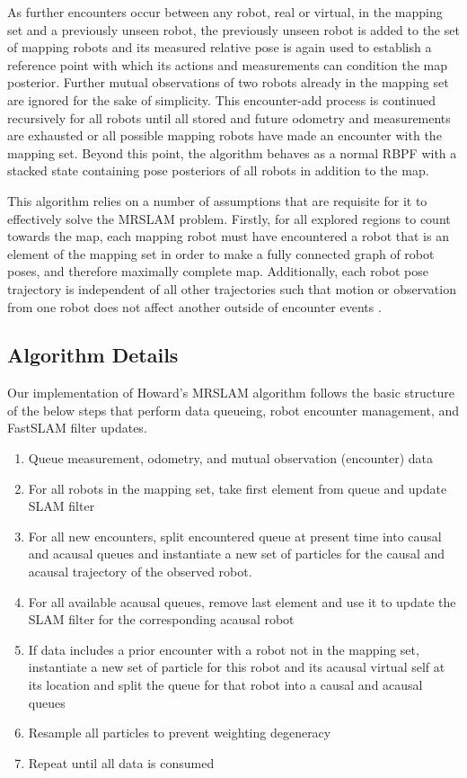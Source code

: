 As further encounters occur between any robot, real or virtual, in the mapping set and a previously unseen robot, the previously unseen robot is added to the set of mapping robots and its measured relative pose is again used to establish a reference point with which its actions and measurements can condition the map posterior. Further mutual observations of two robots already in the mapping set are ignored for the sake of simplicity. This encounter-add process is continued recursively for all robots until all stored and future odometry and measurements are exhausted or all possible mapping robots have made an encounter with the mapping set. Beyond this point, the algorithm behaves as a normal RBPF with a stacked state containing pose posteriors of all robots in addition to the map.


This algorithm relies on a number of assumptions that are requisite for it to effectively solve the MRSLAM problem. Firstly, for all explored regions to count towards the map, each mapping robot must have encountered a robot that is an element of the mapping set in order to make a fully connected graph of robot poses, and therefore maximally complete map. Additionally, each robot pose trajectory is independent of all other trajectories such that motion or observation from one robot does not affect another outside of encounter events \cite{howard2006multi}.

\subsection{Algorithm Details}
\label{SS:Alg:Details}
Our implementation of Howard's MRSLAM algorithm follows the basic structure of the below steps that perform data queueing, robot encounter management, and FastSLAM filter updates.
\begin{enumerate}
\item Queue measurement, odometry, and mutual observation (encounter) data
\item For all robots in the mapping set, take first element from queue and update SLAM filter
\item For all new encounters, split encountered queue at present time into causal and acausal queues and instantiate a new set of particles for the causal and acausal trajectory of the observed robot.
\item For all available acausal queues, remove last element and use it to update the SLAM filter for the corresponding acausal robot
\item If data includes a prior encounter with a robot not in the mapping set, instantiate a new set of particle for this robot and its acausal virtual self at its location and split the queue for that robot into a causal and acausal queues
\item Resample all particles to prevent weighting degeneracy
\item Repeat until all data is consumed
\end{enumerate}
\vspace{0.1in}

